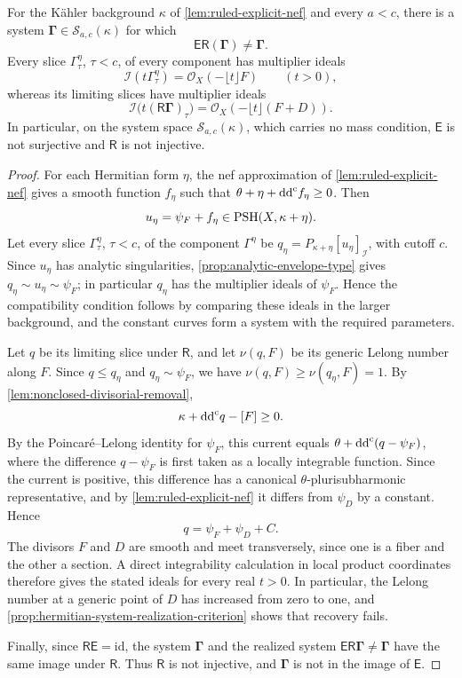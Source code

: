 \begin{theorem}\label{thm:positive-background-system-nonrecovery}
For the K\"ahler background $\kappa$ of \cref{lem:ruled-explicit-nef} and every $a<c$, there is a system $\boldsymbol\Gamma\in\mathscr S_{a,c}(\kappa)$ for which
\[
 \mathsf E\mathsf R(\boldsymbol\Gamma)
                         \neq\boldsymbol\Gamma.
\]
Every slice $\Gamma^\eta_\tau$, $\tau<c$, of every component has multiplier ideals
\[
 \mathcal I(t\Gamma^\eta_\tau)
                 =\mathcal O_X(-\lfloor t\rfloor F)\qquad(t>0),
\]
whereas its limiting slices have multiplier ideals
\[
 \mathcal I\bigl(t(\mathsf R\boldsymbol\Gamma)_\tau\bigr)
                 =\mathcal O_X(-\lfloor t\rfloor(F+D)).
\]
In particular, on the system space $\mathscr S_{a,c}(\kappa)$, which carries no mass condition, $\mathsf E$ is not surjective and $\mathsf R$ is not injective.
\end{theorem}
\begin{proof}
For each Hermitian form $\eta$, the nef approximation of \cref{lem:ruled-explicit-nef} gives a smooth function $f_\eta$ such that $\theta+\eta+\mathrm{dd}^{\mathrm{c}} f_\eta\geq0$. Then
\[
 u_\eta=\psi_F+f_\eta\in\mathrm{PSH}(X,\kappa+\eta).
\]
Let every slice $\Gamma^\eta_\tau$, $\tau<c$, of the component $\Gamma^\eta$ be $q_\eta=P_{\kappa+\eta}[u_\eta]_{\mathcal I}$, with cutoff $c$. Since $u_\eta$ has analytic singularities, \cref{prop:analytic-envelope-type} gives $q_\eta\sim u_\eta\sim\psi_F$; in particular $q_\eta$ has the multiplier ideals of $\psi_F$. Hence the compatibility condition follows by comparing these ideals in the larger background, and the constant curves form a system with the required parameters.

Let $q$ be its limiting slice under $\mathsf R$, and let $\nu(q,F)$ be its generic Lelong number along $F$. Since $q\leq q_\eta$ and $q_\eta\sim\psi_F$, we have $\nu(q,F)\geq\nu(q_\eta,F)=1$. By \cref{lem:nonclosed-divisorial-removal},
\[
 \kappa+\mathrm{dd}^{\mathrm{c}} q-[F]\geq0.
\]
By the Poincar\'e--Lelong identity for $\psi_F$, this current equals $\theta+\mathrm{dd}^{\mathrm{c}}(q-\psi_F)$, where the difference $q-\psi_F$ is first taken as a locally integrable function. Since the current is positive, this difference has a canonical $\theta$-plurisubharmonic representative, and by \cref{lem:ruled-explicit-nef} it differs from $\psi_D$ by a constant. Hence
\[
 q=\psi_F+\psi_D+C.
\]
The divisors $F$ and $D$ are smooth and meet transversely, since one is a fiber and the other a section. A direct integrability calculation in local product coordinates therefore gives the stated ideals for every real $t>0$. In particular, the Lelong number at a generic point of $D$ has increased from zero to one, and \cref{prop:hermitian-system-realization-criterion} shows that recovery fails.

Finally, since $\mathsf R\mathsf E=\mathrm{id}$, the system $\boldsymbol\Gamma$ and the realized system $\mathsf E\mathsf R\boldsymbol\Gamma\neq\boldsymbol\Gamma$ have the same image under $\mathsf R$. Thus $\mathsf R$ is not injective, and $\boldsymbol\Gamma$ is not in the image of $\mathsf E$.
\end{proof}

